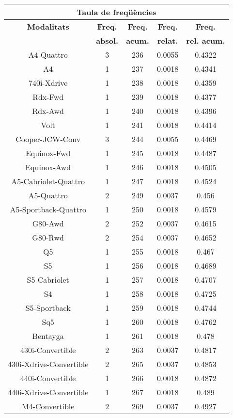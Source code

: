 \begin{center}
\begin{tabular}{|c|c|c|c|@{}c@{}|}
\hline
\multicolumn{5}{|c|}{\bf Taula de freq\" u\`encies} \\ 
\hline
{\bf Modalitats} & {\bf Freq.} & {\bf Freq.} & {\bf Freq.} & {\bf Freq.} \\ 
 & {\bf absol.} & {\bf acum.} & {\bf relat.} & {\bf rel. acum.} \\ 
\hline
\hline
A4-Quattro & 3 & 236 & 0.0055 & 0.4322 \\ 
A4 & 1 & 237 & 0.0018 & 0.4341 \\ 
740i-Xdrive & 1 & 238 & 0.0018 & 0.4359 \\ 
Rdx-Fwd & 1 & 239 & 0.0018 & 0.4377 \\ 
Rdx-Awd & 1 & 240 & 0.0018 & 0.4396 \\ 
Volt & 1 & 241 & 0.0018 & 0.4414 \\ 
Cooper-JCW-Conv & 3 & 244 & 0.0055 & 0.4469 \\ 
Equinox-Fwd & 1 & 245 & 0.0018 & 0.4487 \\ 
Equinox-Awd & 1 & 246 & 0.0018 & 0.4505 \\ 
A5-Cabriolet-Quattro & 1 & 247 & 0.0018 & 0.4524 \\ 
A5-Quattro & 2 & 249 & 0.0037 & 0.456 \\ 
A5-Sportback-Quattro & 1 & 250 & 0.0018 & 0.4579 \\ 
G80-Awd & 2 & 252 & 0.0037 & 0.4615 \\ 
G80-Rwd & 2 & 254 & 0.0037 & 0.4652 \\ 
Q5 & 1 & 255 & 0.0018 & 0.467 \\ 
S5 & 1 & 256 & 0.0018 & 0.4689 \\ 
S5-Cabriolet & 1 & 257 & 0.0018 & 0.4707 \\ 
S4 & 1 & 258 & 0.0018 & 0.4725 \\ 
S5-Sportback & 1 & 259 & 0.0018 & 0.4744 \\ 
Sq5 & 1 & 260 & 0.0018 & 0.4762 \\ 
Bentayga & 1 & 261 & 0.0018 & 0.478 \\ 
430i-Convertible & 2 & 263 & 0.0037 & 0.4817 \\ 
430i-Xdrive-Convertible & 2 & 265 & 0.0037 & 0.4853 \\ 
440i-Convertible & 1 & 266 & 0.0018 & 0.4872 \\ 
440i-Xdrive-Convertible & 1 & 267 & 0.0018 & 0.489 \\ 
M4-Convertible & 2 & 269 & 0.0037 & 0.4927 \\ 

\end{tabular}
\end{center}
